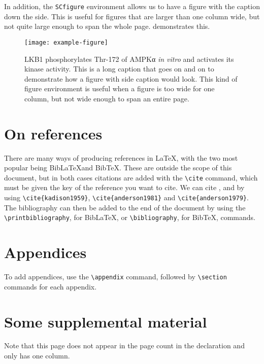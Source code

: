 \documentclass{sensor-cdt-mres}
\begin{document}
In addition, the \texttt{SCfigure} environment allows us to have a figure with the caption down the side.
This is useful for figures that are larger than one column wide, but not quite large enough to span the whole page.
 demonstrates this.


\begin{SCfigure*}
	\texttt{[image: example-figure]}
	\caption{
		LKB1 phosphorylates Thr-172 of AMPKα \textit{in vitro}
		and activates its kinase activity.
		This is a long caption that goes on and on to demonstrate how a figure with side caption would look.
		This kind of figure environment is useful when a figure is too wide for one column, but not wide enough to span an entire page.
	}
\label{fig:two-column-figure}
\end{SCfigure*}


\section{On references}
There are many ways of producing references in \LaTeX, with the two most popular being Bib\LaTeX and Bib\TeX.
These are outside the scope of this document, but in both cases citations are added with the \texttt{\textbackslash cite} command, which must be given the key of the reference you want to cite.
We can cite \cite{kadison1959}, \cite{anderson1981} and \cite{anderson1979} by using \texttt{\textbackslash cite\{kadison1959\}}, \texttt{\textbackslash cite\{anderson1981\}} and \texttt{\textbackslash cite\{anderson1979\}}.
The bibliography can then be added to the end of the document by using the \texttt{\textbackslash printbibliography}, for Bib\LaTeX, or \texttt{\textbackslash bibliography}, for Bib\TeX, commands.

\section{Appendices}
To add appendices, use the \texttt{\textbackslash appendix} command, followed by \texttt{\textbackslash section} commands for each appendix.


\printbibliography

\appendix

\section{Some supplemental material}
Note that this page does not appear in the page count in the declaration and only has one column.
\end{document}
